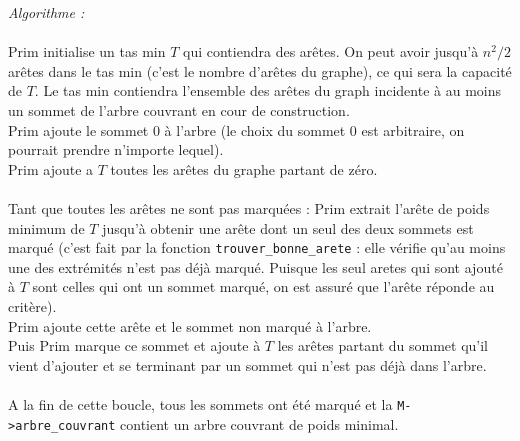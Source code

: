 \documentclass[a4paper,11pt]{article}
\begin{document}
\textit{Algorithme : } \\
\\
Prim initialise un tas min $T$ qui contiendra des arêtes. On peut avoir jusqu'à $n^2/2$ arêtes dans le tas min (c'est le nombre d'arêtes du graphe), ce qui sera la capacité de $T$. Le tas min contiendra l'ensemble des arêtes du graph incidente à au moins un sommet de l'arbre couvrant en cour de construction.\\
Prim ajoute le sommet 0 à l'arbre (le choix du sommet 0 est arbitraire, on pourrait prendre n'importe lequel).\\
Prim ajoute a $T$ toutes les arêtes du graphe partant de zéro.\\
\\
Tant que toutes les arêtes ne sont pas marquées : 
Prim extrait l'arête de poids minimum de $T$ jusqu'à obtenir une arête dont un seul des deux sommets est marqué (c'est fait par la fonction \texttt{trouver\_bonne\_arete} : elle vérifie qu'au moins une des extrémités n'est pas déjà marqué. Puisque les seul aretes qui sont ajouté à $T$ sont celles qui ont un sommet marqué, on est assuré que l'arête réponde au critère).\\
Prim ajoute cette arête et le sommet non marqué à l'arbre.\\
Puis Prim marque ce sommet et ajoute à $T$ les arêtes partant du sommet qu'il vient d'ajouter et se terminant par un sommet qui n'est pas déjà dans l'arbre.\\
\\
A la fin de cette boucle, tous les sommets ont été marqué et la \texttt{M->arbre\_couvrant} contient un arbre couvrant de poids minimal.\\
\end{document}
